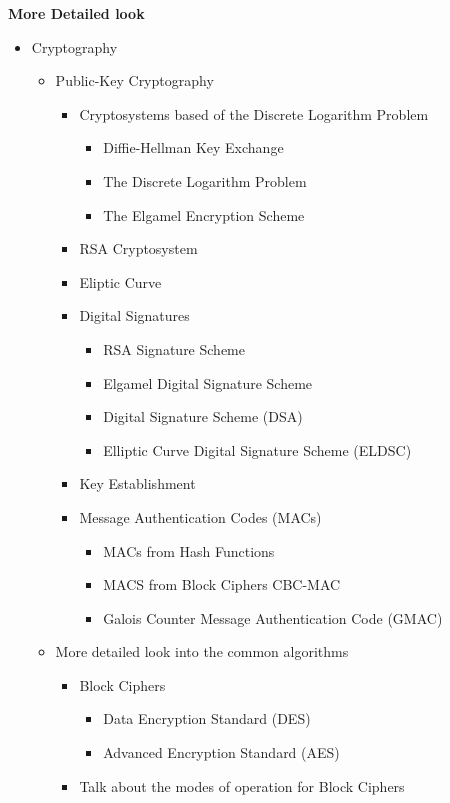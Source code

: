 \textbf{More Detailed look}
\begin{itemize} %
\item{Cryptography
\begin{itemize}
\item{Public-Key Cryptography
\begin{itemize}
\item{Cryptosystems based of the Discrete Logarithm Problem
\begin{itemize}
\item{Diffie-Hellman Key Exchange}
\item{The Discrete Logarithm Problem}
\item{The Elgamel Encryption Scheme}
\end{itemize}}
\item{RSA Cryptosystem}
\item{Eliptic Curve}
\item{Digital Signatures
\begin{itemize}
\item{RSA Signature Scheme}
\item{Elgamel Digital Signature Scheme}
\item{Digital Signature Scheme (DSA)}
\item{Elliptic Curve Digital Signature Scheme (ELDSC)}
\end{itemize}}
\item{Key Establishment}
\item{Message Authentication Codes (MACs)
\begin{itemize}
\item{MACs from Hash Functions}
\item{MACS from Block Ciphers CBC-MAC}
\item{Galois Counter Message Authentication Code (GMAC)}
\end{itemize}}
\end{itemize}}
\item{More detailed look into the common algorithms
\begin{itemize}
\item{Block Ciphers
\begin{itemize}
\item{Data Encryption Standard (DES)}
\item{Advanced Encryption Standard (AES)}
\end{itemize}}
\item{Talk about the modes of operation for Block Ciphers
\begin{itemize}

\end{itemize}}
\end{itemize}}
\end{itemize}}
\end{itemize}
